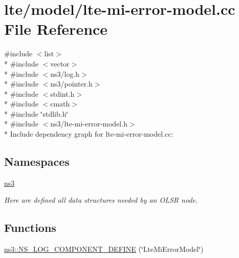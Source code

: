 \hypertarget{lte-mi-error-model_8cc}{}\section{lte/model/lte-\/mi-\/error-\/model.cc File Reference}
\label{lte-mi-error-model_8cc}
{\ttfamily \#include $<$list$>$}\\*
{\ttfamily \#include $<$vector$>$}\\*
{\ttfamily \#include $<$ns3/log.\+h$>$}\\*
{\ttfamily \#include $<$ns3/pointer.\+h$>$}\\*
{\ttfamily \#include $<$stdint.\+h$>$}\\*
{\ttfamily \#include $<$cmath$>$}\\*
{\ttfamily \#include \char`\"{}stdlib.\+h\char`\"{}}\\*
{\ttfamily \#include $<$ns3/lte-\/mi-\/error-\/model.\+h$>$}\\*
Include dependency graph for lte-\/mi-\/error-\/model.cc\+:
\subsection*{Namespaces}
\begin{DoxyCompactItemize}
\item 
 \hyperlink{namespacens3}{ns3}
\begin{DoxyCompactList}\small\item\em Here are defined all data structures needed by an O\+L\+SR node. \end{DoxyCompactList}\end{DoxyCompactItemize}
\subsection*{Functions}
\begin{DoxyCompactItemize}
\item 
\hyperlink{namespacens3_acd677c548657fecd856371d39f17f1c8}{ns3\+::\+N\+S\+\_\+\+L\+O\+G\+\_\+\+C\+O\+M\+P\+O\+N\+E\+N\+T\+\_\+\+D\+E\+F\+I\+NE} (\char`\"{}Lte\+Mi\+Error\+Model\char`\"{})
\end{DoxyCompactItemize}
